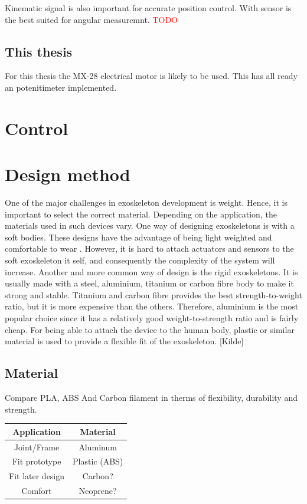 Kinematic signal is also important for accurate position control.
With sensor is the best suited for angular measuremnt.
 \textcolor{red}{TODO}

\subsection{This thesis}
For this thesis the MX-28 electrical motor is likely to be used. This has all ready an potenitimeter implemented. 



\section{Control}



\section{Design method}
One of the major challenges in exoskeleton development is weight.  Hence, it is important to select the correct material. Depending on the application, the materials used in such devices vary. One way of designing exoskeletons is with a soft bodies. These designs have the advantage of being light weighted and comfortable to wear \cite{sEMG-based2019, lu2019development, sridar2017development}. However, it is hard to attach actuators and sensors to the soft exoskeleton it self, and consequently the complexity of the system will increase. Another and more common way of design is the rigid exoskeletons. It is usually made with a steel, aluminium, titanium or carbon fibre body to make it strong and stable. Titanium and carbon fibre provides the best strength-to-weight ratio, but it is more expensive than the others. Therefore, aluminium is the most popular choice since it has a relatively good weight-to-strength ratio and is fairly cheap. For being able to attach the device to the human body, plastic or similar material is used to provide a flexible fit of the exoskeleton. [Kilde] 

\subsection{Material}
Compare PLA, ABS And Carbon filament in therms of flexibility, durability and strength.


\begin{table}[h!]
\centering
\begin{tabular}{|c|c|}
\hline
\textbf{Application} & \textbf{Material} \\ \hline
Joint/Frame & Aluminum \\ \hline
Fit prototype & Plastic (ABS) \\ \hline
Fit later design & Carbon? \\ \hline
Comfort & Neoprene? \\ \hline
\end{tabular}
\end{table}

